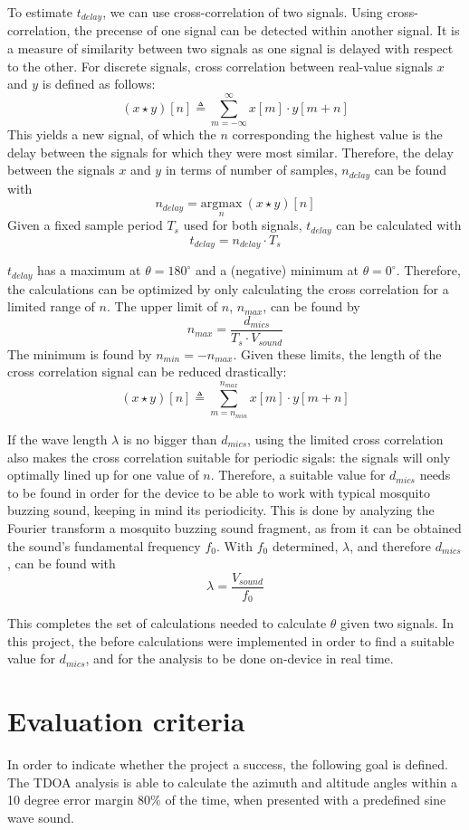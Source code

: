 \documentclass[a4paper]{article}
\begin{document}
To estimate $t_{delay}$, we can use cross-correlation of two signals. Using cross-correlation, the precense of one signal can be detected within another signal. It is a measure of similarity between two signals as one signal is delayed with respect to the other. For discrete signals, cross correlation between real-value signals $x$ and $y$ is defined as follows: \[(x \star y)[n] \triangleq \sum_{m = -\infty}^ {\infty} x[m]\cdot y[m + n]\] This yields a new signal, of which the $n$ corresponding the highest value is the delay between the signals for which they were most similar. Therefore, the delay between the signals $x$ and $y$ in terms of number of samples, $n_{delay}$ can be found with \[n_{delay} = \underset{n}{\mathrm{argmax}}\ (x \star y)[n]\] Given a fixed sample period $T_s$ used for both signals, $t_{delay}$ can be calculated with \[t_{delay} = n_{delay} \cdot T_s\]

$t_{delay}$ has a maximum at $\theta = 180^{\circ}$ and a (negative) minimum at $\theta = 0^{\circ}$. Therefore, the calculations can be optimized by only calculating the cross correlation for a limited range of $n$. The upper limit of $n$, $n_{max}$, can be found by \[n_{max} = \frac{d_{mics}}{T_s \cdot V_{sound}}\] The minimum is found by $n_{min} = -n_{max}$. Given these limits, the length of the cross correlation signal can be reduced drastically:\[(x \star y)[n] \triangleq \sum_{m = n_{min}}^ {n_{max}} x[m]\cdot y[m + n]\] 

If the wave length $\lambda$ is no bigger than $d_{mics}$, using the limited cross correlation also makes the cross correlation suitable for periodic sigals: the signals will only optimally lined up for one value of $n$. Therefore, a suitable value for $d_{mics}$ needs to be found in order for the device to be able to work with typical mosquito buzzing sound, keeping in mind its periodicity. This is done by analyzing the Fourier transform a mosquito buzzing sound fragment\cite{mosquito_fragment}, as from it can be obtained the sound's fundamental frequency $f_0$. With $f_0$ determined, $\lambda$, and therefore $d_{mics}$, can be found with \[\lambda = \frac{V_{sound}}{f_0}\]

This completes the set of calculations needed to calculate $\theta$ given two signals. In this project, the before calculations were implemented in order to find a suitable value for $d_{mics}$, and for the analysis to be done on-device in real time.

\section{Evaluation criteria}
In order to indicate whether the project a success, the following goal is defined. The TDOA analysis is able to calculate the azimuth and altitude angles within a 10 degree error margin 80\% of the time, when presented with a predefined sine wave sound.
\end{document}
